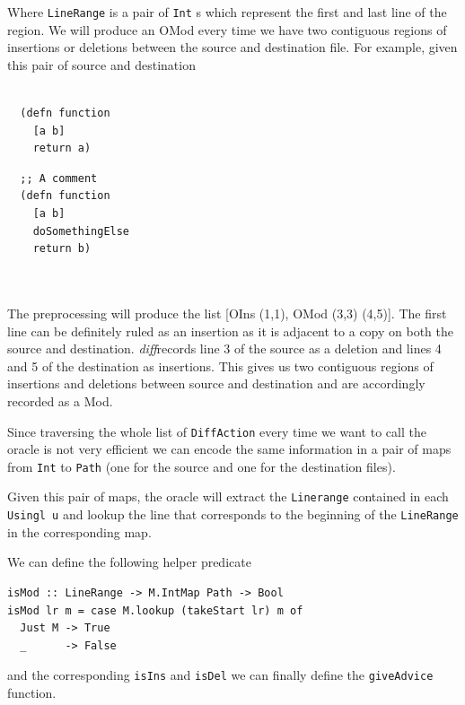 \documentclass[11pt, titlepage]{article}
\newcommand{\toHaskell}[1]{\texttt{#1}\xspace}
\newcommand{\diff}{\emph{diff}}
\begin{document}
Where \toHaskell{LineRange} is a pair of \toHaskell{Int}s which represent the first and last line of the region.
We will produce an OMod every time we have two contiguous regions of insertions or deletions between the source and destination file.
For example, given this pair of source and destination
\\
\\
\begin{minipage}[t]{0.5\textwidth}
\begin{verbatim}
  (defn function
    [a b]
    return a)
\end{verbatim}
\end{minipage}
\begin{minipage}[t]{0.4\textwidth}
\begin{verbatim}
  ;; A comment
  (defn function
    [a b]
    doSomethingElse
    return b)
\end{verbatim}
\end{minipage}
\\
\\
The preprocessing will produce the list [OIns (1,1), OMod (3,3) (4,5)]. The first line can be definitely ruled as an insertion as it is adjacent to a copy on both the source and destination. \diff records line 3 of the source as a deletion and lines 4 and 5 of the destination as insertions. This gives us two contiguous regions of insertions and deletions between source and destination and are accordingly recorded as a Mod. 

Since traversing the whole list of \toHaskell{DiffAction} every time we want to call the oracle is not very efficient we can encode the same information in a pair of maps from \toHaskell{Int} to \toHaskell{Path} (one for the source and one for the destination files). 

Given this pair of maps, the oracle will extract the \toHaskell{Linerange} contained in each \toHaskell{Usingl u} and lookup the line that corresponds to the beginning of the \toHaskell{LineRange} in the corresponding map. 

We can define the following helper predicate

\begin{verbatim}
isMod :: LineRange -> M.IntMap Path -> Bool
isMod lr m = case M.lookup (takeStart lr) m of
  Just M -> True
  _      -> False
\end{verbatim}
and the corresponding \toHaskell{isIns} and \toHaskell{isDel} we can finally define the \toHaskell{giveAdvice} function.
\end{document}
